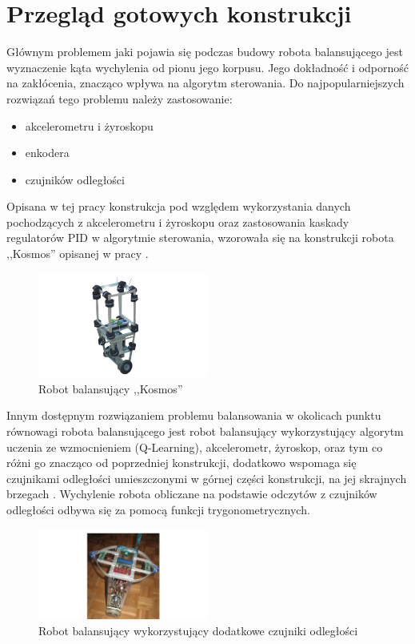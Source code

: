 \section{Przegląd gotowych konstrukcji}

Głównym problemem jaki pojawia się podczas budowy robota balansującego jest wyznaczenie kąta wychylenia od pionu jego korpusu. Jego dokładność i odporność na zakłócenia, znacząco wpływa na algorytm sterowania. Do najpopularniejszych rozwiązań tego problemu należy zastosowanie:
\begin{itemize}
    \item akcelerometru i żyroskopu
    \item enkodera 
    \item czujników odległości
\end{itemize}

Opisana w tej pracy konstrukcja pod względem wykorzystania danych pochodzących z akcelerometru i żyroskopu oraz zastosowania kaskady regulatorów PID w algorytmie sterowania, wzorowała się na konstrukcji robota ,,Kosmos'' opisanej w pracy \cite{Kosmos}.

\begin{figure}[h!]
    \centering
	\includegraphics[width=0.5\textwidth]{Rysunki/Rozdzial01/Robot_Kosmos.png}
	\caption{Robot balansujący ,,Kosmos''}
\end{figure}

Innym dostępnym rozwiązaniem problemu balansowania w okolicach punktu równowagi robota balansującego jest robot balansujący wykorzystujący algorytm uczenia ze wzmocnieniem (Q-Learning), akcelerometr, żyroskop, oraz tym co różni go znacząco od poprzedniej konstrukcji, dodatkowo wspomaga się czujnikami odległości umieszczonymi w górnej części konstrukcji, na jej skrajnych brzegach \cite{Konstrukcja2}. Wychylenie robota obliczane na podstawie odczytów z czujników odległości odbywa się za pomocą funkcji trygonometrycznych. 

\begin{figure}[h!]
    \centering
	\includegraphics[width=0.5\textwidth]{Rysunki/Rozdzial01/Konstrukcja2.png}
	\caption{Robot balansujący wykorzystujący dodatkowe czujniki odległości}
\end{figure}

